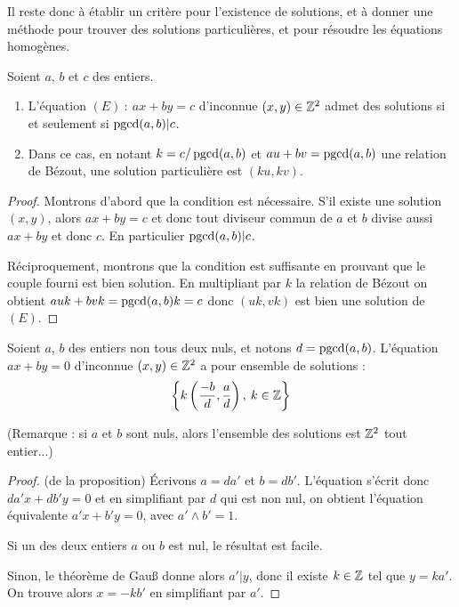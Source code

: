 Il reste donc à établir un critère pour l'existence de solutions, et à donner une méthode pour trouver des solutions particulières, et pour résoudre les équations homogènes.

\begin{proposition}
Soient $a$, $b$ et $c$ des entiers.
\begin{enumerate}
\item L'équation $(E)\: : \: ax+by=c$ d'inconnue $(x,y)\in \mathbb{Z}^2$ admet des solutions si et seulement si $\operatorname{pgcd}(a,b)|c$.
\item Dans ce cas, en notant $k=c/\operatorname{pgcd}(a,b)$ et $au+bv=\operatorname{pgcd}(a,b)$ une relation de Bézout, une solution particulière est $(ku,kv)$.
\end{enumerate}
\end{proposition}
\begin{proof}
Montrons d'abord que la condition est nécessaire. S'il existe une solution $(x,y)$, alors $ax+by=c$ et donc tout diviseur commun de $a$ et $b$ divise aussi $ax+by$ et donc $c$. En  particulier $\operatorname{pgcd}(a,b) | c$.

Réciproquement, montrons que la condition est suffisante en prouvant que le couple fourni est bien solution. En multipliant par $k$ la relation de Bézout on obtient $auk+bvk=\operatorname{pgcd}(a,b) k=c$ donc $(uk,vk)$ est bien une solution de $(E)$.
\end{proof}


\begin{proposition}
Soient $a$, $b$ des entiers non tous deux  nuls, et notons $d = \operatorname{pgcd}(a,b)$. L'équation $ax+by=0$ d'inconnue $(x,y)\in \mathbb{Z}^2$ a pour ensemble de solutions :
\[
\left\{k\left(\frac{-b}{d} , \frac{a}{d}\right),\: k\in \mathbb{Z}\right\}
\]
\end{proposition}

(Remarque : si $a$ et $b$ sont nuls, alors l'ensemble des solutions est $\mathbb{Z}^2$ tout entier...)

\begin{proof}(de la proposition)
\'Ecrivons $a=da'$ et $b=db'$. L'équation s'écrit donc $da'x+db'y=0$ et en simplifiant par $d$ qui est non nul, on obtient l'équation équivalente $a'x+b'y=0$, avec $a'\wedge b'=1$.

Si un des deux entiers $a$ ou $b$ est nul, le résultat est facile.

Sinon, le théorème de Gau{\ss} donne alors $a'|y$, donc il existe $k\in \mathbb{Z}$ tel que $y = ka'$.  On trouve alors $x=-kb'$ en simplifiant par $a'$.
\end{proof}

